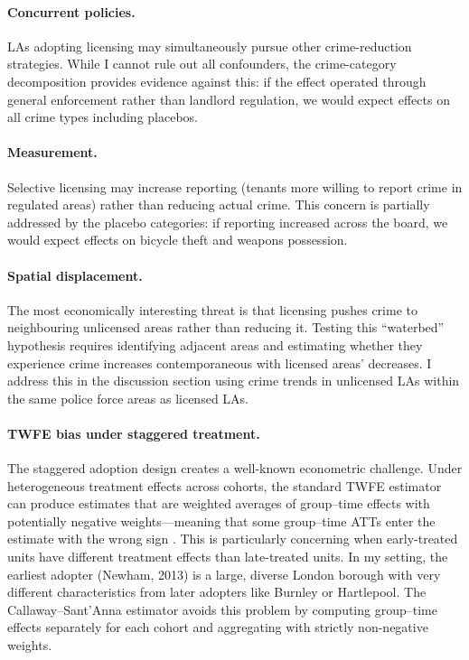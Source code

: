 \documentclass[12pt]{article}
\begin{document}
\paragraph{Concurrent policies.} LAs adopting licensing may simultaneously pursue other crime-reduction strategies. While I cannot rule out all confounders, the crime-category decomposition provides evidence against this: if the effect operated through general enforcement rather than landlord regulation, we would expect effects on all crime types including placebos.

\paragraph{Measurement.} Selective licensing may increase reporting (tenants more willing to report crime in regulated areas) rather than reducing actual crime. This concern is partially addressed by the placebo categories: if reporting increased across the board, we would expect effects on bicycle theft and weapons possession.

\paragraph{Spatial displacement.} The most economically interesting threat is that licensing pushes crime to neighbouring unlicensed areas rather than reducing it. Testing this ``waterbed'' hypothesis requires identifying adjacent areas and estimating whether they experience crime increases contemporaneous with licensed areas' decreases. I address this in the discussion section using crime trends in unlicensed LAs within the same police force areas as licensed LAs.

\paragraph{TWFE bias under staggered treatment.} The staggered adoption design creates a well-known econometric challenge. Under heterogeneous treatment effects across cohorts, the standard TWFE estimator can produce estimates that are weighted averages of group--time effects with potentially negative weights---meaning that some group--time ATTs enter the estimate with the wrong sign \citep{goodmanbacon2021}. This is particularly concerning when early-treated units have different treatment effects than late-treated units. In my setting, the earliest adopter (Newham, 2013) is a large, diverse London borough with very different characteristics from later adopters like Burnley or Hartlepool. The Callaway--Sant'Anna estimator avoids this problem by computing group--time effects separately for each cohort and aggregating with strictly non-negative weights.
\end{document}
